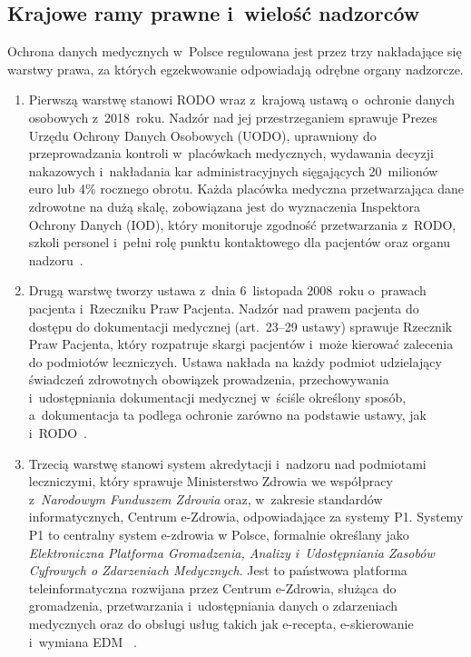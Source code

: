 \subsection*{Krajowe ramy prawne i~wielość nadzorców}

Ochrona danych medycznych w~Polsce regulowana jest przez trzy nakładające się
warstwy prawa, za których egzekwowanie odpowiadają odrębne organy nadzorcze.

\begin{enumerate}[label=(\roman*)]
  \item Pierwszą warstwę stanowi RODO wraz z~krajową ustawą o~ochronie danych osobowych z~2018~roku. Nadzór nad jej przestrzeganiem sprawuje Prezes Urzędu Ochrony Danych Osobowych (UODO), uprawniony do przeprowadzania kontroli w~placówkach medycznych, wydawania decyzji nakazowych i~nakładania kar administracyjnych sięgających 20~milionów euro lub 4\% rocznego obrotu. Każda placówka medyczna przetwarzająca dane zdrowotne na dużą skalę, zobowiązana jest do wyznaczenia Inspektora Ochrony Danych (IOD), który monitoruje zgodność przetwarzania z~RODO, szkoli personel i~pełni rolę punktu kontaktowego dla pacjentów oraz organu nadzoru~\autocite{przewodnik_rodo_dane_zdrowotne}.

  \item Drugą warstwę tworzy ustawa z~dnia 6~listopada 2008~roku o~prawach pacjenta i~Rzeczniku Praw Pacjenta. Nadzór nad prawem pacjenta do dostępu do dokumentacji medycznej (art.~23--29 ustawy) sprawuje Rzecznik Praw Pacjenta, który rozpatruje skargi pacjentów i~może kierować zalecenia do podmiotów leczniczych. Ustawa nakłada na każdy podmiot udzielający świadczeń zdrowotnych obowiązek prowadzenia, przechowywania i~udostępniania dokumentacji medycznej w~ściśle określony sposób, a~dokumentacja ta podlega ochronie zarówno na podstawie ustawy, jak i~RODO~\autocite{rpp_dokumentacja}.

  \item Trzecią warstwę stanowi system akredytacji i~nadzoru nad podmiotami leczniczymi, który sprawuje {Ministerstwo Zdrowia} we współpracy z~\textit{Narodowym Funduszem Zdrowia} oraz, w~zakresie standardów informatycznych, {Centrum e-Zdrowia}, odpowiadające za systemy P1. Systemy P1 to centralny system e-zdrowia w Polsce, formalnie określany jako \textit{Elektroniczna Platforma Gromadzenia, Analizy i~Udostępniania Zasobów Cyfrowych o Zdarzeniach Medycznych}. Jest to państwowa platforma teleinformatyczna rozwijana przez Centrum e-Zdrowia, służąca do gromadzenia, przetwarzania i~udostępniania danych o zdarzeniach medycznych oraz do obsługi usług takich jak e-recepta, e-skierowanie i~wymiana EDM ~\autocite{sc_prawa_pacjenta}.
\end{enumerate}  

